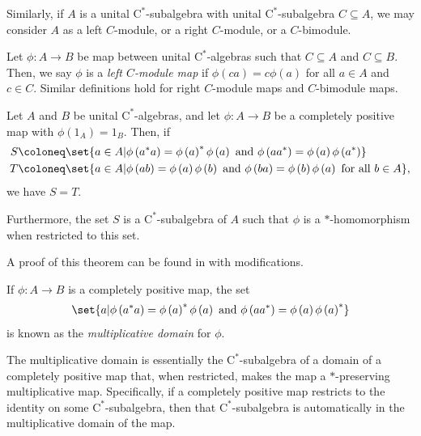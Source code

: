 Similarly, if $A$ is a unital $\mathrm{C}^{\ast}$-subalgebra with unital $\mathrm{C}^{\ast}$-subalgebra $C\subseteq A$, we may consider $A$ as a left $C$-module, or a right $C$-module, or a $C$-bimodule. 
\begin{definition}
  Let $\phi\colon A\rightarrow B$ be map between unital $\mathrm{C}^{\ast}$-algebras such that $C\subseteq A$ and $C\subseteq B$. Then, we say $\phi$ is a \textit{left $C$-module map} if $\phi\left( ca \right) = c\phi\left( a \right)$ for all $a\in A$ and $c\in C$. Similar definitions hold for right $C$-module maps and $C$-bimodule maps.
\end{definition}
\begin{theorem}\label{thm:preview_multiplicative_domain}
  Let $A$ and $B$ be unital $\mathrm{C}^{\ast}$-algebras, and let $\phi\colon A\rightarrow B$ be a completely positive map with $\phi\left(1_A\right) = 1_B$. Then, if
  \begin{align*}
    S &\coloneq\set{a\in A | \phi\left( a^{\ast}a \right) = \phi\left( a \right)^{\ast}\phi\left( a \right)\text{ and }\phi\left( aa^{\ast} \right) = \phi\left( a \right)\phi\left( a^{\ast} \right)}\\
      T&\coloneq \set{a\in A | \phi\left( ab \right) = \phi\left( a \right)\phi\left( b \right)\text{ and }\phi\left( ba \right) = \phi\left( b \right)\phi\left( a \right)\text{ for all }b\in A},
  \end{align*}
  we have $S = T$.\newline

  Furthermore, the set $S$ is a $\mathrm{C}^{\ast}$-subalgebra of $A$ such that $\phi$ is a $\ast$-homomorphism when restricted to this set.
\end{theorem}
A proof of this theorem can be found in \cite{completely_bounded_maps_and_operator_algebras} with modifications. 
\begin{definition}
  If $\phi\colon A\rightarrow B$ is a completely positive map, the set
  \begin{align*}
    \set{a | \phi\left( a^{\ast}a \right) = \phi\left( a \right)^{\ast}\phi\left( a \right)\text{ and }\phi\left( aa^{\ast} \right) = \phi\left( a \right)\phi\left( a \right)^{\ast}}
  \end{align*}
  is known as the \textit{multiplicative domain} for $\phi$.
\end{definition}
The multiplicative domain is essentially the $\mathrm{C}^{\ast}$-subalgebra of a domain of a completely positive map that, when restricted, makes the map a $\ast$-preserving multiplicative map. Specifically, if a completely positive map restricts to the identity on some $\mathrm{C}^{\ast}$-subalgebra, then that $\mathrm{C}^{\ast}$-subalgebra is automatically in the multiplicative domain of the map.
